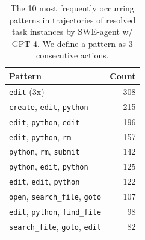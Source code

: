 \begin{table}
    \caption{
    The 10 most frequently occurring patterns in trajectories of resolved task instances by SWE-agent w/ GPT-4. We define a pattern as 3 consecutive actions.
    }
    \label{tab:most_common_triples}
    \vspace{0.25em}
        \centering
    \begin{tabular}{>{\scriptsize}lr}
        \toprule
            \normalsize Pattern & Count \\
        \midrule
            \texttt{edit} (3x) & 308 \\
            \texttt{create}, \texttt{edit}, \texttt{python} & 215 \\
            \texttt{edit}, \texttt{python}, \texttt{edit} & 196 \\
            \texttt{edit}, \texttt{python}, \texttt{rm} & 157 \\
            \texttt{python}, \texttt{rm}, \texttt{submit} & 142 \\
            \texttt{python}, \texttt{edit}, \texttt{python} & 125 \\
            \texttt{edit}, \texttt{edit}, \texttt{python} & 122 \\
            \texttt{open}, \texttt{search\_file}, \texttt{goto} & 107 \\
            \texttt{edit}, \texttt{python}, \texttt{find\_file} & 98 \\
            \texttt{search\_file}, \texttt{goto}, \texttt{edit} & 82 \\
        \bottomrule
    \end{tabular}
\end{table}